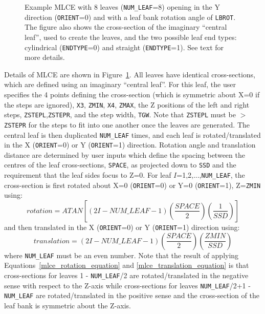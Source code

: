 \documentclass[12pt,twoside]{article}
\begin{document}
\begin{figure}[htpb]
\begin{center}
\begin{htmlonly}
\end{htmlonly}
\end{center}
\caption[MLCE CM geometry]
{Example MLCE with 8 leaves ({\tt NUM\_LEAF}=8) opening in the Y
direction ({\tt ORIENT}=0) and with a leaf bank rotation angle
of {\tt LBROT}.  The figure also shows the cross-section
of the imaginary ``central leaf'', used to create the leaves, and
the two possible leaf end types: cylindrical ({\tt ENDTYPE}=0) and
straight ({\tt ENDTYPE}=1).  See text for more details.}
\label{mlce_fig}
\end{figure}

Details of MLCE are shown in Figure~\ref{mlce_fig}.  All leaves have
identical cross-sections, which are defined using an imaginary
``central leaf''.  For this leaf,
the user specifies the 4 points defining the cross-section (which is symmetric
about X=0 if the steps are ignored),
{\tt X3}, {\tt ZMIN}, {\tt X4}, {\tt ZMAX}, the Z positions of the left and right
steps, {\tt ZSTEPL},{\tt ZSTEPR}, and the step width, {\tt TGW}.   Note that
{\tt ZSTEPL} must be $>${\tt ZSTEPR} for the steps to fit into one another
once the leaves are generated.  The central leaf is then duplicated
{\tt NUM\_LEAF} times, and each leaf is rotated/translated in the
X ({\tt ORIENT}=0) or Y ({\tt ORIENT}=1) direction.
Rotation angle and translation distance are determined by user
inputs which define the spacing between the
centres of the leaf cross-sections, {\tt SPACE},
as projected down to {\tt SSD} and the requirement that the leaf sides
focus to Z=0.   For leaf $I$=1,2,...,{\tt NUM\_LEAF}, the cross-section
is first rotated about X=0 ({\tt ORIENT}=0)
or Y=0 ({\tt ORIENT}=1), Z={\tt ZMIN} using:
\begin{equation}
rotation=
ATAN\left[\left(2I-NUM\_LEAF-1\right)\left(\frac{SPACE}{2}\right)\left(\frac{1}{SSD}\right)\right]
\label{mlce_rotation_equation}
\end{equation}
and then translated in the X ({\tt ORIENT}=0) or Y
({\tt ORIENT}=1) direction using:
\begin{equation}
translation=
\left(2I-NUM\_LEAF-1\right)\left(\frac{SPACE}{2}\right)\left(\frac{ZMIN}{SSD}\right)
\label{mlce_translation_equation}
\end{equation}
where {\tt NUM\_LEAF} must be an even number.  Note that the result of
applying Equations~\ref{mlce_rotation_equation} and \ref{mlce_translation_equation} is that cross-sections for
leaves 1 - {\tt NUM\_LEAF}/2 are rotated/translated in the negative sense with respect to the Z-axis
while cross-sections for leaves {\tt NUM\_LEAF}/2+1 - {\tt NUM\_LEAF} are rotated/translated in the positive
sense and the cross-section of the leaf bank is symmetric about the Z-axis.
\end{document}
